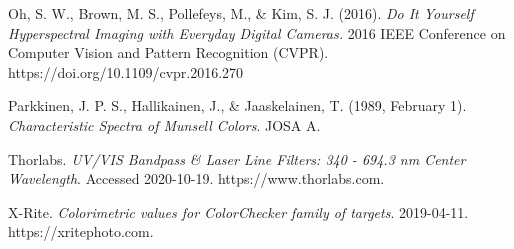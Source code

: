 \documentclass[twocolumn,10pt]{asme2ej}
\begin{document}
\begin{thebibliography}{12}
{Oh, S. W., Brown, M. S., Pollefeys, M., \& Kim, S. J. (2016). \emph{Do It Yourself Hyperspectral Imaging with Everyday Digital Cameras.} 2016 IEEE Conference on Computer Vision and Pattern Recognition (CVPR). https://doi.org/10.1109/cvpr.2016.270}

 {Parkkinen, J. P. S., Hallikainen, J., \& Jaaskelainen, T. (1989, February 1). \emph{Characteristic Spectra of Munsell Colors}. JOSA A.}

{Thorlabs. \emph{UV/VIS Bandpass \& Laser Line Filters: 340 - 694.3 nm Center Wavelength}. Accessed 2020-10-19. https://www.thorlabs.com.}

{X-Rite. \emph{Colorimetric values for ColorChecker family of targets}. 2019-04-11. https://xritephoto.com.}

\end{thebibliography}
 
 
\end{document}
